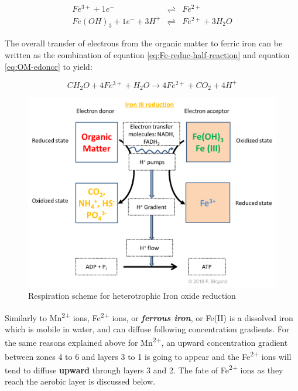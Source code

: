 \documentclass[]{book}
\theoremstyle{definition}
\theoremstyle{definition}
\theoremstyle{definition}
\theoremstyle{remark}
\begin{document}
\begin{align}
Fe^{3+} + 1 e^- & \rightleftharpoons & Fe^{2+} \\
Fe(OH)_3 + 1 e^- + 3 H^+ & \rightleftharpoons & Fe^{2+} + 3 H_2O
\label{eq:Fe-reduc-half-reaction}
\end{align}

The overall transfer of electrons from the organic matter to ferric iron
can be written as the combination of equation
\eqref{eq:Fe-reduc-half-reaction} and equation \eqref{eq:OM-edonor} to
yield:

\begin{equation}
CH_2O + 4 Fe^{3+} + H_2O \rightarrow 4 Fe^{2+} + CO_2  + 4 H^+
\label{eq:Fe-reduc}
\end{equation}

\begin{figure}

{\centering \includegraphics[width=0.75\linewidth]{pictures/respiration-OM-Fe} 

}

\caption{Respiration scheme for heterotrophic Iron oxide reduction}\label{fig:Fe-resp}
\end{figure}

Similarly to Mn\textsuperscript{2+} ions, Fe\textsuperscript{2+} ions,
or \emph{\textbf{ferrous iron}}, or Fe(II) is a dissolved iron which is
mobile in water, and can diffuse following concentration gradients. For
the same reasons explained above for Mn\textsuperscript{2+}, an upward
concentration gradient between zones 4 to 6 and layers 3 to 1 is going
to appear and the Fe\textsuperscript{2+} ions will tend to diffuse
\textbf{upward} through layers 3 and 2. The fate of
Fe\textsuperscript{2+} ions as they reach the aerobic layer is discussed
below.
\end{document}
